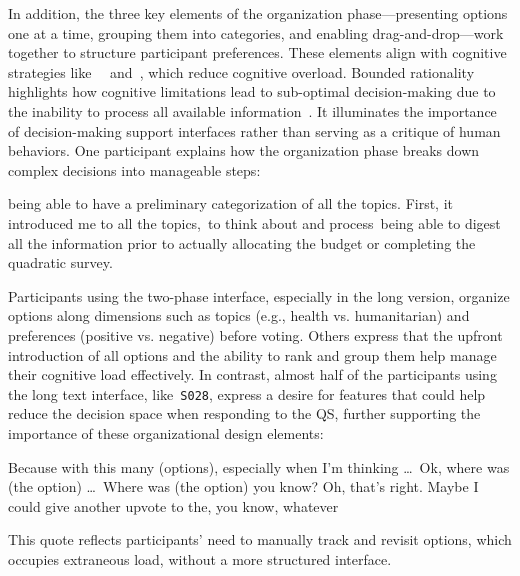 In addition, the three key elements of the organization phase—presenting options one at a time, grouping them into categories, and enabling drag-and-drop—work together to structure participant preferences. These elements align with cognitive strategies like~\textit{}~\cite{simonSciencesArtificial1996} and~\textit{}, which reduce cognitive overload. Bounded rationality highlights how cognitive limitations lead to sub-optimal decision-making due to the inability to process all available information~\cite{simonBehavioralModelRational1955}. It illuminates the importance of decision-making support interfaces rather than serving as a critique of human behaviors. One participant explains how the organization phase breaks down complex decisions into manageable steps:  

\begin{displayquote}  
\bracketellipsis being able to have a preliminary categorization of all the topics. First, it introduced me to all the topics,~\bracketellipsis to think about and process~\bracketellipsis being able to digest all the information prior to actually allocating the budget or completing the quadratic survey. \hfill{}  
\end{displayquote}  

Participants using the two-phase interface, especially in the long version, organize options along dimensions such as topics (e.g., health vs. humanitarian) and preferences (positive vs. negative) before voting. Others express that the upfront introduction of all options and the ability to rank and group them help manage their cognitive load effectively. In contrast, almost half of the participants using the long text interface, like~\texttt{S028}, express a desire for features that could help reduce the decision space when responding to the QS, further supporting the importance of these organizational design elements:

\begin{displayquote}  
Because with this many (options), especially when I'm thinking \ldots\ Ok, where was (the option) \ldots\ Where was (the option) you know? Oh, that's right. Maybe I could give another upvote to the, you know, whatever~\bracketellipsis \hfill{}  
\end{displayquote}  

This quote reflects participants' need to manually track and revisit options, which occupies extraneous load, without a more structured interface.  

